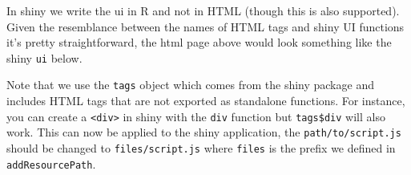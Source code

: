 \documentclass[
]{krantz}
\makeatletter
\newenvironment{Shaded}{\begin{snugshade}}{\end{snugshade}}
\newcommand{\CommentTok}[1]{\textcolor[rgb]{0.37,0.37,0.37}{\textit{#1}}}
\newcommand{\ControlFlowTok}[1]{\textcolor[rgb]{0.27,0.27,0.27}{\textbf{#1}}}
\newcommand{\DataTypeTok}[1]{\textcolor[rgb]{0.27,0.27,0.27}{#1}}
\newcommand{\KeywordTok}[1]{\textcolor[rgb]{0.27,0.27,0.27}{\textbf{#1}}}
\newcommand{\NormalTok}[1]{#1}
\newcommand{\OperatorTok}[1]{\textcolor[rgb]{0.43,0.43,0.43}{\textbf{#1}}}
\newcommand{\StringTok}[1]{\textcolor[rgb]{0.5,0.5,0.5}{#1}}
\newenvironment{kframe}{%
\medskip{}
\setlength{\fboxsep}{.8em}
 \def\at@end@of@kframe{}%
 \ifinner\ifhmode%
  \def\at@end@of@kframe{\end{minipage}}%
  \begin{minipage}{\columnwidth}%
 \fi\fi%
 \def\FrameCommand##1{\hskip\@totalleftmargin \hskip-\fboxsep
 \colorbox{shadecolor}{##1}\hskip-\fboxsep
     \hskip-\linewidth \hskip-\@totalleftmargin \hskip\columnwidth}%
 \MakeFramed {\advance\hsize-\width
   \@totalleftmargin\z@ \linewidth\hsize
   \@setminipage}}%
 {\par\unskip\endMakeFramed%
 \at@end@of@kframe}
\renewenvironment{Shaded}{\begin{kframe}}{\end{kframe}}
\makeatother
\begin{document}
In shiny we write the ui in R and not in HTML (though this is also supported). Given the resemblance between the names of HTML tags and shiny UI functions it's pretty straightforward, the html page above would look something like the shiny \texttt{ui} below.

\begin{Shaded}
\end{Shaded}

Note that we use the \texttt{tags} object which comes from the shiny package and includes HTML tags that are not exported as standalone functions. For instance, you can create a \texttt{\textless{}div\textgreater{}} in shiny with the \texttt{div} function but \texttt{tags\$div} will also work. This can now be applied to the shiny application, the \texttt{path/to/script.js} should be changed to \texttt{files/script.js} where \texttt{files} is the prefix we defined in \texttt{addResourcePath}.

\begin{Shaded}
\end{Shaded}
\end{document}
